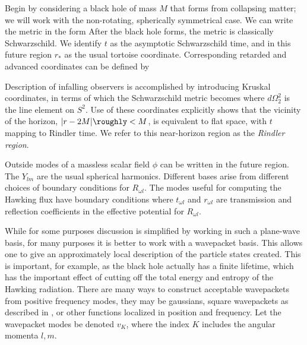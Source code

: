 Begin by considering a black hole of mass $M$ that forms from collapsing matter; we will work with the non-rotating, spherically symmetrical case.  We can write the metric in the form
%
\eqn{}
%
After the black hole forms, the metric is classically Schwarzschild.  We identify $t$ as the asymptotic Schwarzschild time, and in this future region $r_*$ as the usual tortoise coordinate.  Corresponding retarded and advanced coordinates can be defined by
%
\eqn{}
%

Description of infalling observers is accomplished by introducing Kruskal coordinates,
%
\eqn{}
%
in terms of which the Schwarzschild metric becomes
%
\eqn{}
%
where $d\Omega_2^2$ is the line element on $S^2$.  Use of these coordinates explicitly shows that the vicinity of the horizon, $|r-2M|\roughly< M$, is equivalent to flat space, with $t$ mapping to Rindler time.  We refer to this near-horizon region as the {\it Rindler region}.



Outside modes of a massless scalar field $\phi$ can be written
%
\eqn{}
%
in the future region.  The $Y_{lm}$ are the usual spherical harmonics.  Different bases arise from different choices of boundary conditions for $R_{\omega l}$.  The modes useful for computing the Hawking flux have boundary conditions 
%
\eqn{}
%
where $t_{\omega l}$ and $r_{\omega l}$ are transmission and reflection coefficients in the effective potential for $R_{\omega l}$.

While for some purposes discussion is simplified by working in such a plane-wave basis, for many purposes it is better to work with a wavepacket basis.  This allows one to give an approximately local description of the particle states created.  This is important, for example, as the black hole actually has a finite lifetime, which has the important effect of cutting off the total energy and entropy of the Hawking radiation.
There are many ways to construct acceptable wavepackets from positive frequency modes, they may be gaussians, square wavepackets
%
\eqn{}
%
as described in  , or other functions localized in position and frequency.
Let the wavepacket modes be denoted $v_K$, where the index $K$ includes the angular momenta $l,m$.

